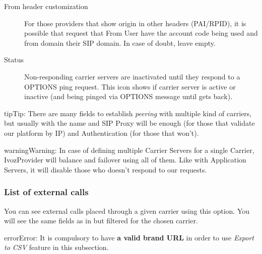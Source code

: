 \documentclass[letterpaper,10pt,english]{sphinxmanual}
\begin{document}
\begin{description}
\item[{From header customization}] \leavevmode{}\label{administration_portal/brand/providers/carriers:term-from-header-customization}
For those providers that show origin in other headers (PAI/RPID), it is
possible that request that From User have the account code being used
and from domain their SIP domain. In case of doubt, leave empty.

\item[{Status}] \leavevmode{}\label{administration_portal/brand/providers/carriers:term-15}
Non-responding carrier servers are inactivated until they respond to a OPTIONS ping request. This icon shows
if carrier server is active or inactive (and being pinged via OPTIONS message until gets back).

\end{description}

\begin{notice}{tip}{Tip:}
There are many fields to establish \emph{peering} with multiple kind of
carriers, but usually with the name and SIP Proxy will be enough (for
those that validate our platform by IP) and Authentication (for those that
won't).
\end{notice}

\begin{notice}{warning}{Warning:}
In case of defining multiple Carrier Servers for a single
Carrier, IvozProvider will balance and failover using all of them.
Like with Application Servers, it will disable those who doesn't respond to
our requests.
\end{notice}


\subsubsection{List of external calls}
\label{administration_portal/brand/providers/carriers:list-of-external-calls}
You can see external calls placed through a given carrier using this option. You will see the same fields as in
{\hyperref[administration_portal/platform/external_calls:external\string-calls]{}} but filtered for the chosen carrier.

\begin{notice}{error}{Error:}
It is compulsory to have \textbf{a valid brand URL} in order to use \emph{Export to CSV} feature in this subsection.
\end{notice}
\end{document}
